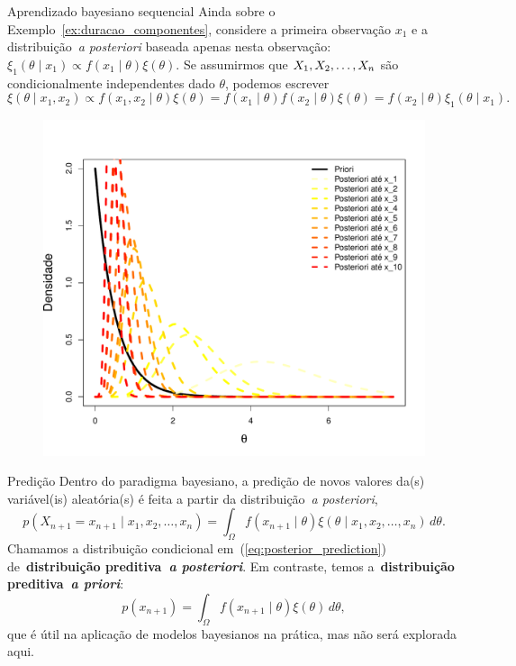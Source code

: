 \begin{frame}{Aprendizado bayesiano sequencial}
Ainda sobre o Exemplo~\ref{ex:duracao_componentes}, considere a primeira observação $x_1$ e a distribuição~\textit{a posteriori} baseada apenas nesta observação: $\xi_1(\theta \mid x_1) \propto f(x_1 \mid \theta)\xi(\theta)$.
Se assumirmos que $X_1, X_2, \ldots, X_n$ são condicionalmente independentes dado $\theta$, podemos escrever 
\[\xi(\theta \mid x_1, x_2) \propto f(x_1, x_2 \mid \theta)\xi(\theta) = f(x_1 \mid \theta)f(x_2 \mid \theta)\xi(\theta) = f(x_2 \mid \theta)\xi_1(\theta \mid x_1). \]
    \begin{figure}[!ht]
    \label{fig:posterior_componentes_sequencial}
    \begin{center}
    \includegraphics[scale=0.32]{figures/sequential_Bayes_componentes.pdf} 
    \end{center} 
    \end{figure} 
\end{frame}
\begin{frame}{Predição}
 Dentro do paradigma bayesiano, a predição de novos valores da(s) variável(is) aleatória(s) é feita a partir da distribuição~\textit{a posteriori},
 \begin{equation}
  \label{eq:posterior_prediction}
  p(X_{n+1} = x_{n+1} \mid x_1, x_2, \ldots, x_n) = \int_{\Omega} f(x_{n+1} \mid \theta)\xi(\theta \mid x_1, x_2, \ldots, x_n)\, d\theta.
 \end{equation}
Chamamos a distribuição condicional em~(\ref{eq:posterior_prediction}) de~\textbf{distribuição preditiva~\textit{a posteriori}}.
Em contraste, temos a~\textbf{distribuição preditiva~\textit{a priori}}:
 \begin{equation}
  \label{eq:prior_prediction}
  p(x_{n+1}) = \int_{\Omega} f(x_{n+1} \mid \theta)\xi(\theta)\, d\theta,
 \end{equation}
que é útil na aplicação de modelos bayesianos na prática, mas não será explorada aqui.
\end{frame}

